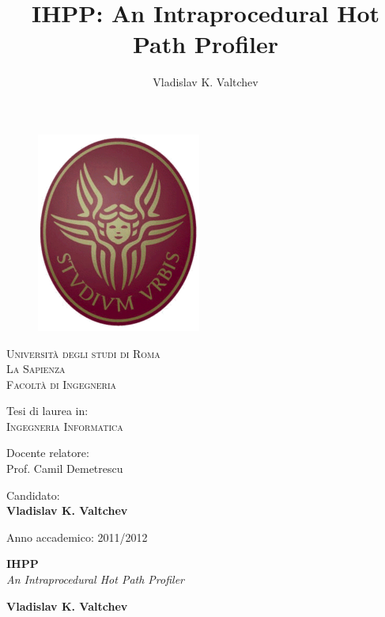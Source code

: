 \documentclass[a4paper,11pt]{report}
\author{Vladislav K. Valtchev}
\title{IHPP: An Intraprocedural Hot Path Profiler}
\begin{document}
\thispagestyle{empty}

\begin{figure}
\centering
\includegraphics[scale=0.6]{logo}
\end{figure}


\begin{center}


{\Large\textsc{Universit\`a degli studi di Roma}\\} 
{\huge\textsc{La Sapienza}\\[10pt]}
{\huge\textsc{Facolt\`a di Ingegneria}\\[40pt]} 

{\large Tesi di laurea in: \\}
{\LARGE\textsc{Ingegneria Informatica}\\[50pt]}

{\large Docente relatore: \\}
{\large Prof. Camil Demetrescu\\[20pt]}

{\large Candidato: \\}
{\large \textbf{Vladislav K. Valtchev}\\[40pt]}

{\large Anno accademico: 2011/2012\\}


\end{center}


\pagebreak

\thispagestyle{empty}

\begin{center}

\vspace*{4.5cm}

\fontsize{70}{90}\selectfont \textbf{IHPP}\\
\fontsize{20}{35}\selectfont
\textit{An Intraprocedural Hot Path Profiler}\\

\vspace{11cm}

\fontsize{14}{20}\selectfont
\textbf{Vladislav K. Valtchev}

\end{center}
\pagebreak
\end{document}
